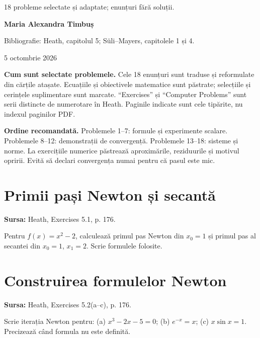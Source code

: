 \documentclass[11pt,a4paper]{article}
\begin{document}
\begin{titlepage}\vspace{18mm}{\sffamily\bfseries\Huge Fișă de probleme\par}\vspace{10mm}{\Large Ecuații și sisteme neliniare\par}\vspace{7mm}18 probleme selectate și adaptate; enunțuri fără soluții.\par\vfill\textbf{Maria Alexandra Timbuș}\par Bibliografie: Heath, capitolul 5; Süli--Mayers, capitolele 1 și 4.\par 5 octombrie 2026\end{titlepage}\hypersetup{pageanchor=true}\textbf{Cum sunt selectate problemele.} Cele 18 enunțuri sunt traduse și reformulate din cărțile atașate. Ecuațiile și obiectivele matematice sunt păstrate; selecțiile și cerințele suplimentare sunt marcate. ``Exercises'' și ``Computer Problems'' sunt serii distincte de numerotare în Heath. Paginile indicate sunt cele tipărite, nu indexul paginilor PDF.

\textbf{Ordine recomandată.} Problemele 1--7: formule și experimente scalare. Problemele 8--12: demonstrații de convergență. Problemele 13--18: sisteme și norme. La exercițiile numerice păstrează aproximările, reziduurile și motivul opririi. Evită să declari convergența numai pentru că pasul este mic.
\begingroup\small\setlength{\parskip}{0pt}\tableofcontents\endgroup\newpage
{}
\section{Primii pași Newton și secantă}
\textbf{Sursa:} Heath, Exercises 5.1, p. 176.

Pentru $f(x)=x^2-2$, calculează primul pas Newton din $x_0=1$ și primul pas al secantei din $x_0=1$, $x_1=2$. Scrie formulele folosite.



\section{Construirea formulelor Newton}
\textbf{Sursa:} Heath, Exercises 5.2(a--c), p. 176.

Scrie iterația Newton pentru: (a) $x^3-2x-5=0$; (b) $e^{-x}=x$; (c) $x\sin x=1$. Precizează când formula nu este definită.
\end{document}
